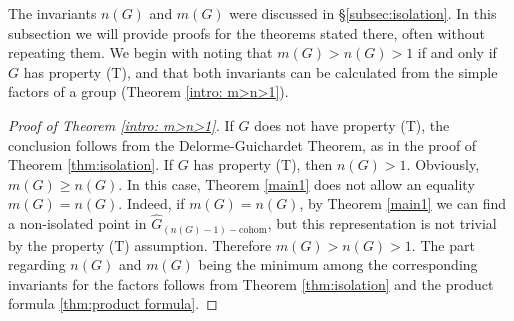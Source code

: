 \documentclass[12pt,reqno]{amsart}
\theoremstyle{definition}
\begin{document}
The invariants $n(G)$ and $m(G)$ were discussed in \S\ref{subsec:isolation}. In this subsection we will provide proofs for the theorems stated there, often without repeating them. We begin with noting that $m(G)>n(G)>1$ if and only if $G$ has property (T), and that both invariants can be calculated from the simple factors of a group (Theorem \ref{intro: m>n>1}).
\begin{proof}[Proof of Theorem \ref{intro: m>n>1}]
    If $G$ does not have property (T), the conclusion follows from the Delorme-Guichardet Theorem, as in the proof of Theorem \ref{thm:isolation}. If $G$ has property (T), then $n(G)>1$. Obviously, $m(G) \geq n(G)$. In this case, Theorem \ref{main1} does not allow an equality $m(G)=n(G)$. Indeed, if $m(G)=n(G)$, by Theorem \ref{main1} we can find a non-isolated point in $\widehat{G}_{(n(G)-1)-\mathrm{cohom}}$, but this representation is not trivial by the property (T) assumption. Therefore $m(G)>n(G)>1$. The part regarding $n(G)$ and $m(G)$ being the minimum among the corresponding invariants for the factors follows from Theorem \ref{thm:isolation} and the product formula \ref{thm:product formula}.
\end{proof}
\end{document}
